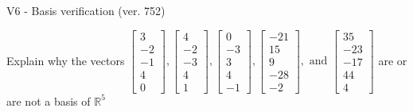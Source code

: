 \begin{exercise}
  \begin{exerciseTitle}V6 - Basis verification (ver. 752)\end{exerciseTitle}
  \begin{exerciseStatement}
    Explain why the vectors \(\left[\begin{array}{r}
3 \\
-2 \\
-1 \\
4 \\
0
\end{array}\right] , \left[\begin{array}{r}
4 \\
-2 \\
-3 \\
4 \\
1
\end{array}\right] , \left[\begin{array}{r}
0 \\
-3 \\
3 \\
4 \\
-1
\end{array}\right] , \left[\begin{array}{r}
-21 \\
15 \\
9 \\
-28 \\
-2
\end{array}\right] , \text{ and } \left[\begin{array}{r}
35 \\
-23 \\
-17 \\
44 \\
4
\end{array}\right]\) are or are not a basis of \(\mathbb{R}^5\)	



\end{exerciseStatement}
\end{exercise}
